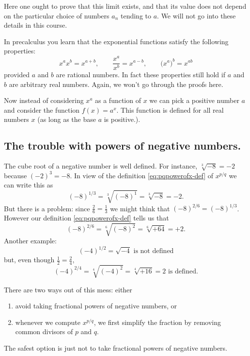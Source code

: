 Here one ought to prove that this limit exists, and that its value does not
depend on the particular choice of numbers $a_n$ tending to $a$. We will not go
into these details in this course.




In precalculus you learn that the exponential functions satisfy the
following properties:
\begin{equation}\label{eq:exponential-properties}
  x^a x^b = x^{a+b}, \qquad
  \dfrac{x^a}{x^b} = x^{a-b}, \qquad
  \bigl(x^a\bigr)^b = x^{ab}
\end{equation}
provided $a$ and $b$ are rational numbers. In fact these properties still
hold if $a$ and $b$ are arbitrary real numbers. Again, we
won't go through the proofs here.




Now instead of considering $x^a$ as a function of $x$ we can pick a positive
number $a$ and consider the function $f(x) = a^x$. This function is defined for
all real numbers $x$ (as long as the base $a$ is positive.).




\subsection{The trouble with powers of negative numbers. } %
The cube root of a negative number is well defined.  For instance,
$\sqrt[3]{-8}=-2$ because $(-2)^3 = -8$.  In view of the definition
\eqref{eq:pqpowerofx-def} of $x^{p/q}$ we can write this as
\[
(-8)^{1/3} = \sqrt[3]{(-8)^1} = \sqrt[3]{-8} = -2.
\]
But there is a problem: since $\frac{2}{6}=\frac13$ we might think that
$(-8)^{2/6} = (-8)^{1/3}$.  However our definition \eqref{eq:pqpowerofx-def}
tells us that
\[
(-8)^{2/6} = \sqrt[6]{(-8)^2} = \sqrt[6]{+64} =  +2.
\]
Another example:
\[
(-4)^{1/2} = \sqrt{-4} \text{ is not defined}
\]
but, even though $\frac12=\frac24$,
\[
(-4)^{2/4} = \sqrt[4]{(-4)^2}  = \sqrt[4]{+16} = 2 \text{ is defined.}
\]

There are two ways out of this mess: either
\begin{enumerate}\sffamily\itshape
\item avoid taking fractional powers of negative numbers, or
\item whenever we compute $x^{p/q}$, we first simplify the fraction by removing
  common divisors of $p$ and $q$.
\end{enumerate}
The safest option is just not to take fractional powers of negative numbers.




